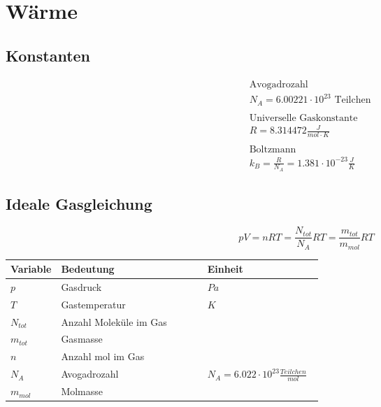 



\chapter{Wärme}

\section{Konstanten}
\[
\boxed{\begin{aligned}	
		&\text{Avogadrozahl} \\
		&N_{A} = 6.00221 \cdot 10^{23}\text{ Teilchen}\\
		\\
		&\text{Universelle Gaskonstante}\\
		&R = 8.314472 \frac{J}{mol \cdot K}\\
		\\
		&\text{Boltzmann}\\
		&k_{B} = \frac{R}{N_{A}}=1.381 \cdot 10^{-23} \frac{J}{K}
	\end{aligned}}	\]

\section{Ideale Gasgleichung}

\[pV = nRT = \frac{N_{tot}}{N_{A}}RT = \frac{m_{tot}}{m_{mol}}RT\]

\begin{tabular*}{\linewidth}{p{0.15\linewidth}lp{0.37\linewidth}}
	\textbf{Variable}				&	\textbf{Bedeutung}		& \textbf{Einheit}\\
	\hline
	\rowcolor{white}$p$			&      Gasdruck				&$Pa$\\
	\rowcolor{lgray}$T$			&	Gastemperatur			& $K$\\
	\rowcolor{white}$N_{tot}$	&	Anzahl Moleküle im Gas	&$ $\\				
	\rowcolor{lgray}$m_{tot}$	&	Gasmasse				&$ $\\
	\rowcolor{white}$n$			&	Anzahl mol im Gas		&$ $\\
	\rowcolor{lgray}$N_{A}$		&	Avogadrozahl			&$N_{A} = 6.022 \cdot 10^{23} \frac{Teilchen}{mol}$\\	
	\rowcolor{white}$m_{mol}$	&	Molmasse				&$ $\\
\end{tabular*}


